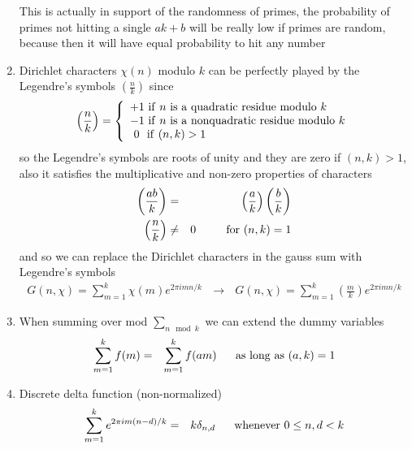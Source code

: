 \documentclass[aps,preprint,preprintnumbers,nofootinbib,showpacs,prd]{revtex4-1}
\newcommand{\nbea}{\begin{eqnarray*}}
\newcommand{\neea}{\end{eqnarray*}}
\begin{document}
\begin{enumerate}
This is actually in support of the randomness of primes, the probability of primes not hitting a single $ak + b$ will be really low if primes are random, because then it will have equal probability to hit any number

\item Dirichlet characters $\chi(n)$ modulo $k$ can be perfectly played by the Legendre's symbols $\left( \frac{n}{k} \right)$ since
%
\nbea
\left(\frac{n}{k}\right) = \left \{
\begin{array}{l}
+1 ~{\rm if} ~ n ~{\rm is~a~quadratic~residue~modulo~} k \\
-1 ~{\rm if} ~ n ~{\rm is~a~non quadratic~residue~modulo~} k \\
~0 ~~{\rm if} ~ (n,k) > 1
\end{array}
\right.
\neea
%
so the Legendre's symbols are roots of unity and they are zero if $(n,k) > 1$, also it satisfies the multiplicative and non-zero properties of characters
%
\nbea
\left ( \frac{ab}{k} \right) & = & \left ( \frac{a}{k} \right) \left ( \frac{b}{k} \right) \\
\left ( \frac{n}{k} \right) & \neq & 0 ~~~~~~~~{\rm for}~ (n,k) = 1
\neea
%
and so we can replace the Dirichlet characters in the gauss sum with Legendre's symbols
%
\nbea
G(n, \chi) = \sum_{m = 1}^k \chi(m) e^{2\pi i mn/k} ~~~ \longrightarrow ~~~ G(n, \chi) = \sum_{m = 1}^k \left(\frac{m}{k}\right) e^{2\pi i mn/k}
\neea
%

\item When summing over mod $\sum_{n \mod k}$ we can extend the dummy variables
%
\nbea
\sum_{m=1}^k f(m) & = & \sum_{m=1}^k f(am) ~~~~~ {\rm as~long~as}~ (a,k) = 1
\neea
%

\item Discrete delta function (non-normalized)
%
\nbea
\sum_{m=1}^k e^{2\pi i m(n-d)/k} & = & k\delta_{n,d} ~~~~~{\rm whenever~} 0 \le n,d < k
\neea
%


\end{enumerate}
\end{document}
